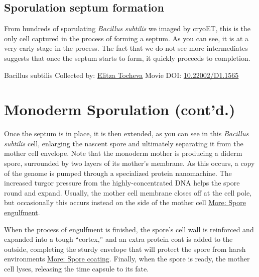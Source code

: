 \documentclass[]{tufte-book}
\begin{document}
\hypertarget{Sporulation_septum_formation}{%
\subsection{Sporulation septum formation}\label{Sporulation_septum_formation}}

From hundreds of sporulating \emph{Bacillus subtilis} we imaged by cryoET, this is the only cell captured in the process of forming a septum. As you can see, it is at a very early stage in the process. The fact that we do not see more intermediates suggests that once the septum starts to form, it quickly proceeds to completion.



\hypertarget{htmlwidget-be9504c89abf4d5783a5}{}

\label{fig:8-5a}Bacillus subtilis Collected by: \protect\hyperlink{elitza_tocheva}{Elitza Tocheva} Movie DOI: \href{https://doi.org/10.22002/D1.1565}{10.22002/D1.1565}

\hypertarget{monoderm-sporulation-contd.}{%
\section{Monoderm Sporulation (cont'd.)}\label{monoderm-sporulation-contd.}}

Once the septum is in place, it is then extended, as you can see in this \emph{Bacillus subtilis} cell, enlarging the nascent spore and ultimately separating it from the mother cell envelope. Note that the monoderm mother is producing a diderm spore, surrounded by two layers of its mother's membrane. As this occurs, a copy of the genome is pumped through a specialized protein nanomachine. The increased turgor pressure from the highly-concentrated DNA helps the spore round and expand. Usually, the mother cell membrane closes off at the cell pole, but occasionally this occurs instead on the side of the mother cell \protect\hyperlink{Spore_engulfment}{More: Spore engulfment}.

When the process of engulfment is finished, the spore's cell wall is reinforced and expanded into a tough ``cortex,'' and an extra protein coat is added to the outside, completing the sturdy envelope that will protect the spore from harsh environments \protect\hyperlink{Spore_coating}{More: Spore coating}. Finally, when the spore is ready, the mother cell lyses, releasing the time capsule to its fate.



\hypertarget{htmlwidget-73bbb0df3079f99a9b65}{}
\end{document}
